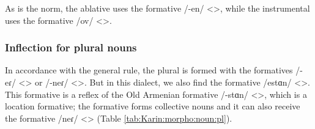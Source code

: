 As is the norm, the ablative uses the formative /-en/ <>, while the instrumental uses the formative /ov/ <>. 

\subsubsection{Inflection for plural nouns}

In accordance with the general rule, the plural is formed with the formatives /-eɾ/ <> or /-neɾ/ <>. But in this dialect, we also find the formative /estɑn/ <>. This formative is a reflex of the Old Armenian formative /-stɑn/ <>, which is a location formative; the formative forms collective nouns and it can also receive the formative /neɾ/ <> (Table \ref{tab:Karin:morpho:noun:pl}). 




\begin{table}[H]
	\centering
	\caption{Plural suffixes in the Karin dialect}
	\label{tab:Karin:morpho:noun:pl}
\end{table}



